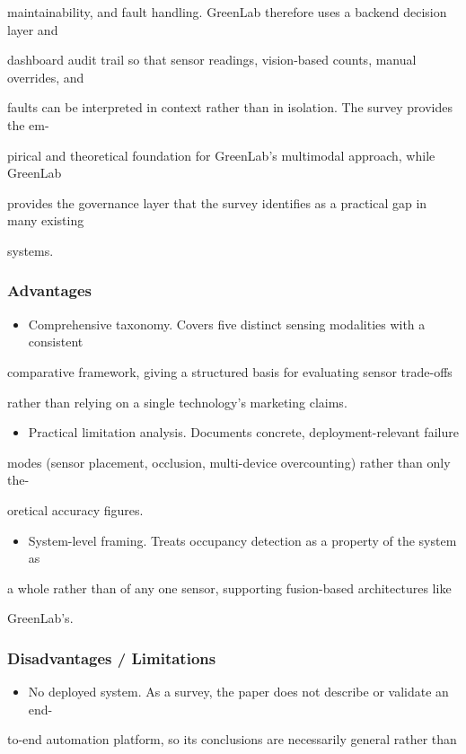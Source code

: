 maintainability, and fault handling. GreenLab therefore uses a backend decision layer and

dashboard audit trail so that sensor readings, vision-based counts, manual overrides, and

faults can be interpreted in context rather than in isolation. The survey provides the em-

pirical and theoretical foundation for GreenLab's multimodal approach, while GreenLab

provides the governance layer that the survey identiﬁes as a practical gap in many existing

systems.


\subsubsection*{Advantages}
\begin{itemize}
	\item Comprehensive taxonomy. Covers ﬁve distinct sensing modalities with a consistent
\end{itemize}
comparative framework, giving a structured basis for evaluating sensor trade-offs

rather than relying on a single technology's marketing claims.

\begin{itemize}
	\item Practical limitation analysis. Documents concrete, deployment-relevant failure
\end{itemize}
modes (sensor placement, occlusion, multi-device overcounting) rather than only the-

oretical accuracy ﬁgures.

\begin{itemize}
	\item System-level framing. Treats occupancy detection as a property of the system as
\end{itemize}
a whole rather than of any one sensor, supporting fusion-based architectures like

GreenLab's.


\subsubsection*{Disadvantages / Limitations}
\begin{itemize}
	\item No deployed system. As a survey, the paper does not describe or validate an end-
\end{itemize}
to-end automation platform, so its conclusions are necessarily general rather than

